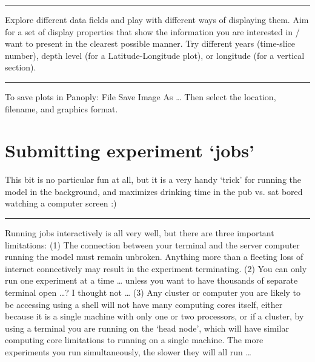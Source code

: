 \documentclass[11pt,fleqn]{book} %
\begin{document}
\vspace{1mm}
\noindent\rule{4cm}{0.1mm}
\vspace{2mm}

Explore different data fields and play with different ways of displaying them. Aim for a set of display properties that show the information you are interested in / want to present in the clearest possible manner. Try different years (time-slice number), depth level (for a Latitude-Longitude plot), or longitude (for a vertical section).

\vspace{1mm}
\noindent\rule{4cm}{0.1mm}
\vspace{2mm}

To save plots in Panoply:
File
Save Image As …
Then select the location, filename, and graphics format.


\newpage


\section{Submitting experiment ‘jobs’}

This bit is no particular fun at all, but it is a very handy ‘trick’ for running the model in the background, and maximizes drinking time in the pub vs. sat bored watching a computer screen :)

\vspace{1mm}
\noindent\rule{4cm}{0.1mm}
\vspace{2mm}

\noindent Running jobs interactively is all very well, but there are three important limitations:
(1) The connection between your terminal and the server computer running the model must remain unbroken. Anything more than a fleeting loss of internet connectively may result in the experiment terminating.
(2) You can only run one experiment at a time … unless you want to have thousands of separate terminal open …? I thought not …
(3) Any cluster or computer you are likely to be accessing using a shell will not have many computing cores itself, either because it is a single machine with only one or two processors, or if a cluster, by using a terminal you are running on the ‘head node’, which will have similar computing core limitations to running on a single machine. The more experiments you run simultaneously, the slower they will all run …
\end{document}
